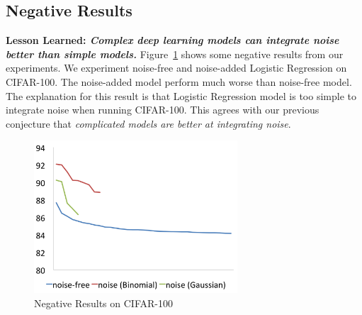 \subsection{Negative Results}

{\bf Lesson Learned: {\em Complex deep learning models can integrate noise
better than simple models.}}
Figure~\ref{neg} shows some negative results from our experiments.
We experiment noise-free and noise-added Logistic Regression on CIFAR-100.
The noise-added model perform much worse than noise-free model. The
explanation for this result is that Logistic Regression model is too
simple to integrate noise when running CIFAR-100. This agrees with our
previous conjecture that {\em complicated models are better at integrating
noise}.
\begin{figure}[!htbp]
\centering
\includegraphics[width=215pt]{f-figs/neg.png}
\caption{Negative Results on CIFAR-100}
\label{neg}
\end{figure}
